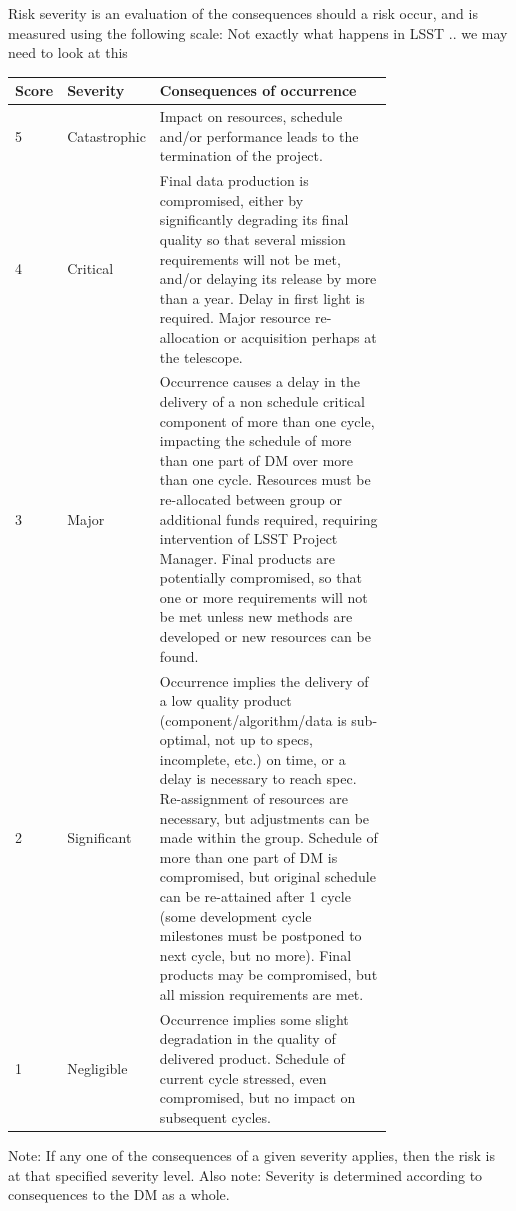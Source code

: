 Risk severity is an evaluation of the consequences should a risk occur, and is measured using the following scale:
{\color{red} Not exactly what happens in LSST .. we may need to look at this}

\begin{tabular}{|l|l|p{0.75\linewidth}|} \hline
Score & Severity & Consequences of occurrence \\ \hline
5 & Catastrophic & Impact on resources, schedule and/or performance leads to the termination of the project. \\ \hline
4 & Critical & Final data production is compromised, either by significantly degrading its final quality so that several mission requirements will not be met,
and/or delaying its release by more than a year. Delay in first light  is required. Major resource re-allocation or acquisition perhaps at the telescope. \\ \hline
3 & Major & Occurrence causes a delay in the delivery of a non schedule critical component of more than one cycle, impacting the schedule of more than one part of DM over more than one cycle. Resources must be re-allocated between group or additional funds required, requiring intervention of LSST Project Manager. Final products are potentially compromised, so that one or more requirements will not be met unless new methods are developed or new resources can be found. \\ \hline
2 & Significant & Occurrence implies the delivery of a low quality product (component/algorithm/data is sub-optimal, not up to specs, incomplete, etc.) on time, or a delay is necessary to reach spec. Re-assignment of resources are necessary, but adjustments can be made within the group. Schedule of more than one part of DM is compromised, but original schedule can be re-attained after 1 cycle (some development cycle milestones must be postponed to next cycle, but no more). Final products may be compromised, but all mission requirements are met. \\ \hline
1 & Negligible & Occurrence implies some slight degradation in the quality of delivered product. Schedule of current cycle stressed, even compromised, but no impact on subsequent cycles. \\ \hline
\end{tabular}

Note: If any one of the consequences of a given severity applies, then the risk is at that specified severity level.
Also note: Severity is determined according to consequences to the DM as a whole.


